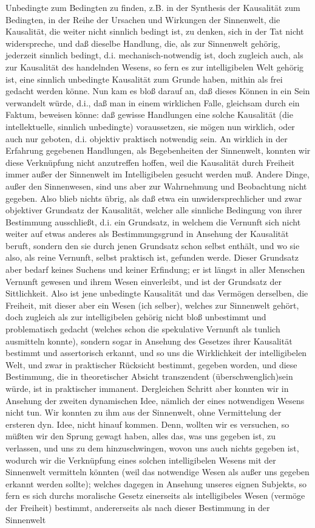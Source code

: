 \documentclass[a4paper,12pt,twoside]{book}
\begin{document}
Unbedingte zum Bedingten zu finden, z.B. in der Synthesis der Kausalität zum Bedingten, in der Reihe der Ursachen und Wirkungen der Sinnenwelt, die Kausalität, die weiter nicht sinnlich bedingt ist, zu denken, sich in der Tat nicht widerspreche, und daß dieselbe Handlung, die, als zur Sinnenwelt gehörig, jederzeit sinnlich bedingt, d.i. mechanisch-notwendig ist, doch zugleich auch, als zur Kausalität des handelnden Wesens, so fern es zur intelligibelen Welt gehörig ist, eine sinnlich unbedingte Kausalität zum Grunde haben, mithin als frei gedacht werden könne. Nun kam es bloß darauf an, daß dieses Können in ein Sein verwandelt würde, d.i., daß man in einem wirklichen Falle, gleichsam durch ein Faktum, beweisen könne: daß gewisse Handlungen eine solche Kausalität (die intellektuelle, sinnlich unbedingte) voraussetzen, sie mögen nun wirklich, oder auch nur geboten, d.i. objektiv praktisch notwendig sein. An wirklich in der Erfahrung  gegebenen Handlungen, als Begebenheiten der Sinnenwelt, konnten wir diese Verknüpfung nicht anzutreffen hoffen, weil die Kausalität durch Freiheit immer außer der Sinnenwelt im Intelligibelen gesucht werden muß. Andere Dinge, außer den Sinnenwesen, sind uns aber zur Wahrnehmung und Beobachtung nicht gegeben. Also blieb nichts übrig, als daß etwa ein unwidersprechlicher und zwar objektiver Grundsatz der Kausalität, welcher alle sinnliche Bedingung von ihrer Bestimmung ausschließt, d.i. ein Grundsatz, in welchem die Vernunft sich nicht weiter auf etwas anderes als Bestimmungsgrund in Ansehung der Kausalität beruft, sondern den sie durch jenen Grundsatz schon selbst enthält, und wo sie also, als reine Vernunft, selbst praktisch ist, gefunden werde. Dieser Grundsatz aber bedarf keines Suchens und keiner Erfindung; er ist längst in aller Menschen Vernunft gewesen und ihrem Wesen einverleibt, und ist der Grundsatz der Sittlichkeit. Also ist jene unbedingte Kausalität und das Vermögen derselben, die Freiheit, mit dieser aber ein Wesen (ich selber), welches zur Sinnenwelt gehört, doch zugleich als zur intelligibelen gehörig nicht bloß unbestimmt und problematisch gedacht (welches schon die spekulative Vernunft als tunlich ausmitteln konnte), sondern sogar in Ansehung des Gesetzes ihrer Kausalität bestimmt und assertorisch erkannt, und so uns die Wirklichkeit der intelligibelen Welt, und zwar in praktischer Rücksicht bestimmt, gegeben worden, und diese Bestimmung, die in theoretischer Absicht transzendent (überschwenglich)sein würde, ist in praktischer immanent. Dergleichen Schritt aber konnten wir in Ansehung der zweiten dynamischen Idee, nämlich der eines notwendigen Wesens nicht tun. Wir konnten zu ihm aus der Sinnenwelt, ohne Vermittelung der ersteren dyn. Idee, nicht hinauf kommen. Denn, wollten wir es versuchen, so müßten wir den Sprung gewagt haben, alles das, was uns gegeben ist, zu verlassen, und uns zu dem hinzuschwingen, wovon uns auch nichts gegeben ist, wodurch wir die Verknüpfung eines solchen intelligibelen Wesens mit der Sinnenwelt vermitteln könnten (weil das notwendige Wesen als außer uns gegeben  erkannt werden sollte); welches dagegen in Ansehung unseres eignen Subjekts, so fern es sich durchs moralische Gesetz einerseits als intelligibeles Wesen (vermöge der Freiheit) bestimmt, andererseits als nach dieser Bestimmung in der Sinnenwelt 
\end{document}
